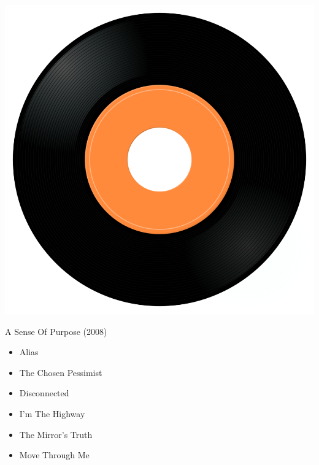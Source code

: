 \begin{minipage}[t]{0.25\textwidth}\vspace{0pt}
\captionsetup{type=figure}
\includegraphics[width=\textwidth]{Images/cover.png}
\caption*{A Sense Of Purpose (2008)}
\end{minipage}
\begin{minipage}[t]{0.25\textwidth}\vspace{0pt}
\begin{itemize}[nosep,leftmargin=1em,labelwidth=*,align=left]
	\setlength{\itemsep}{0pt}
	\item Alias
	\item The Chosen Pessimist
	\item Disconnected
	\item I'm The Highway
	\item The Mirror's Truth
	\item Move Through Me
\end{itemize}
\end{minipage}
